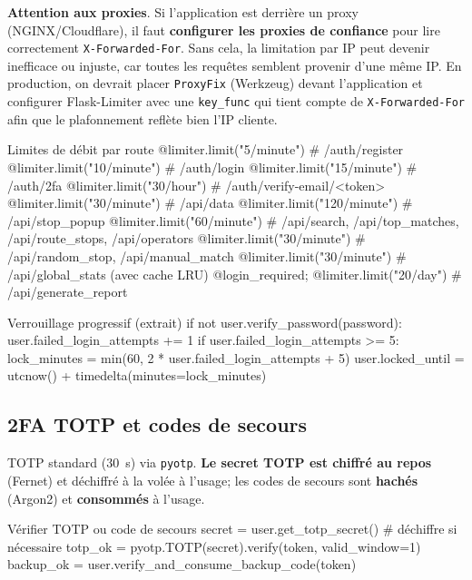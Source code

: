 \noindent \textbf{Attention aux proxies}. Si l'application est derrière un proxy (NGINX/Cloudflare), il faut \textbf{configurer les proxies de confiance} pour lire correctement \texttt{X-Forwarded-For}. Sans cela, la limitation \og par IP \fg{} peut devenir inefficace ou injuste, car toutes les requêtes semblent provenir d'une même IP. En production, on devrait placer \texttt{ProxyFix} (Werkzeug) devant l'application et configurer Flask-Limiter avec une \texttt{key\_func} qui tient compte de \texttt{X-Forwarded-For} afin que le plafonnement reflète bien l'IP cliente.
\begin{codebox}[language=Python]{Limites de débit par route}
@limiter.limit("5/minute")   # /auth/register
@limiter.limit("10/minute")  # /auth/login
@limiter.limit("15/minute")  # /auth/2fa
@limiter.limit("30/hour")    # /auth/verify-email/<token>
@limiter.limit("30/minute")  # /api/data
@limiter.limit("120/minute") # /api/stop_popup
@limiter.limit("60/minute")  # /api/search, /api/top_matches, /api/route_stops, /api/operators
@limiter.limit("30/minute")  # /api/random_stop, /api/manual_match
@limiter.limit("30/minute")  # /api/global_stats (avec cache LRU)
@login_required; @limiter.limit("20/day")  # /api/generate_report
\end{codebox}

\begin{codebox}[language=Python]{Verrouillage progressif (extrait)}
if not user.verify_password(password):
    user.failed_login_attempts += 1
    if user.failed_login_attempts >= 5:
        lock_minutes = min(60, 2 * user.failed_login_attempts + 5)
        user.locked_until = utcnow() + timedelta(minutes=lock_minutes)
\end{codebox}

\subsection*{2FA TOTP et codes de secours}
\noindent TOTP standard (30~s) via \texttt{pyotp}. \textbf{Le secret TOTP est chiffré au repos} (Fernet) et déchiffré à la volée à l'usage; les codes de secours sont \textbf{hachés} (Argon2) et \textbf{consommés} à l'usage.
\begin{codebox}[language=Python]{Vérifier TOTP ou code de secours}
secret = user.get_totp_secret()  # déchiffre si nécessaire
totp_ok = pyotp.TOTP(secret).verify(token, valid_window=1)
backup_ok = user.verify_and_consume_backup_code(token)
\end{codebox}


